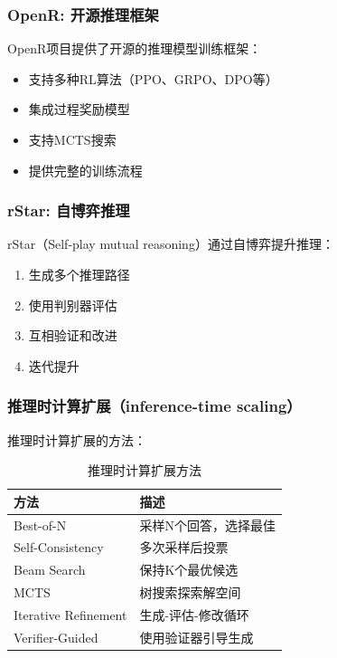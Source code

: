 \documentclass[12pt,a4paper]{article}
\begin{document}
\subsubsection{OpenR: 开源推理框架}

OpenR项目提供了开源的推理模型训练框架：
\begin{itemize}
    \item 支持多种RL算法（PPO、GRPO、DPO等）
    \item 集成过程奖励模型
    \item 支持MCTS搜索
    \item 提供完整的训练流程
\end{itemize}

\subsubsection{rStar: 自博弈推理}

rStar（Self-play mutual reasoning）通过自博弈提升推理：
\begin{enumerate}
    \item 生成多个推理路径
    \item 使用判别器评估
    \item 互相验证和改进
    \item 迭代提升
\end{enumerate}

\subsubsection{推理时计算扩展（inference-time scaling）}

推理时计算扩展的方法：
\begin{table}[H]
\centering
\caption{推理时计算扩展方法}
\begin{tabular}{lp{8cm}}
\toprule
\textbf{方法} & \textbf{描述} \\
\midrule
Best-of-N & 采样N个回答，选择最佳 \\
Self-Consistency & 多次采样后投票 \\
Beam Search & 保持K个最优候选 \\
MCTS & 树搜索探索解空间 \\
Iterative Refinement & 生成-评估-修改循环 \\
Verifier-Guided & 使用验证器引导生成 \\
\bottomrule
\end{tabular}
\end{table}

\end{document}
